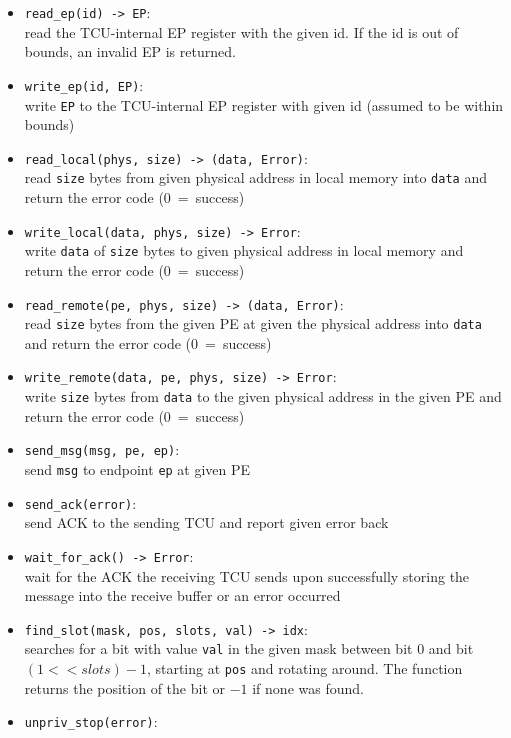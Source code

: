 \begin{itemize}
  \item \texttt{read\_ep(id) -> EP}:\\
  read the TCU-internal EP register with the given id. If the id is out of bounds, an invalid EP is
  returned.
  \item \texttt{write\_ep(id, EP)}:\\
  write \texttt{EP} to the TCU-internal EP register with given id (assumed to be within bounds)
  \item \texttt{read\_local(phys, size) -> (data, Error)}:\\
  read \texttt{size} bytes from given physical address in local memory into \texttt{data} and
  return the error code (0~=~success)
  \item \texttt{write\_local(data, phys, size) -> Error}:\\
  write \texttt{data} of \texttt{size} bytes to given physical address in local memory and
  return the error code (0~=~success)
  \item \texttt{read\_remote(pe, phys, size) -> (data, Error)}:\\
  read \texttt{size} bytes from the given PE at given the physical address into \texttt{data} and
  return the error code (0~=~success)
  \item \texttt{write\_remote(data, pe, phys, size) -> Error}:\\
  write \texttt{size} bytes from \texttt{data} to the given physical address in the given PE and
  return the error code (0~=~success)
  \item \texttt{send\_msg(msg, pe, ep)}:\\
  send \texttt{msg} to endpoint \texttt{ep} at given PE
  \item \texttt{send\_ack(error)}:\\
  send ACK to the sending TCU and report given error back
  \item \texttt{wait\_for\_ack() -> Error}:\\
  wait for the ACK the receiving TCU sends upon successfully storing the message into the receive
  buffer or an error occurred
  \item \texttt{find\_slot(mask, pos, slots, val) -> idx}:\\
  searches for a bit with value \texttt{val} in the given mask between bit 0 and bit $(1 << slots) -
  1$, starting at \texttt{pos} and rotating around. The function returns the position of the bit or
  $-1$ if none was found.
  \item \texttt{unpriv\_stop(error)}:\\

\end{itemize}
